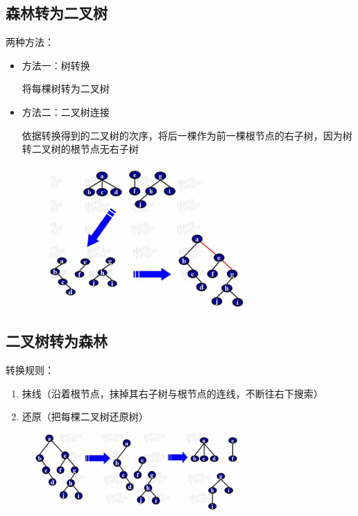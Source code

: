 \documentclass[AutoFakeBold]{LZUThesis2007}
\begin{document}
		\subsection{森林转为二叉树}
		两种方法：
		\begin{itemize}
			\item 方法一：树转换

			将每棵树转为二叉树
			\item 方法二：二叉树连接
		
			依据转换得到的二叉树的次序，将后一棵作为前一棵根节点的右子树，因为树转二叉树的根节点无右子树
			\begin{figure}[H]
			    \centering
			    \includegraphics[width=0.7\textwidth]{figures/7.4.png}
			    
			    \label{fig_install_texlive}
			\end{figure}
		\end{itemize}

		\subsection{二叉树转为森林}
		转换规则：
		\begin{enumerate}
			\item 抹线（沿着根节点，抹掉其右子树与根节点的连线，不断往右下搜索）
			\item 还原（把每棵二叉树还原树）
		\end{enumerate}
		\begin{figure}[H]
		    \centering
		    \includegraphics[width=0.7\textwidth]{figures/7.5.png}
		    
		    \label{fig_install_texlive}
		\end{figure}
\end{document}
